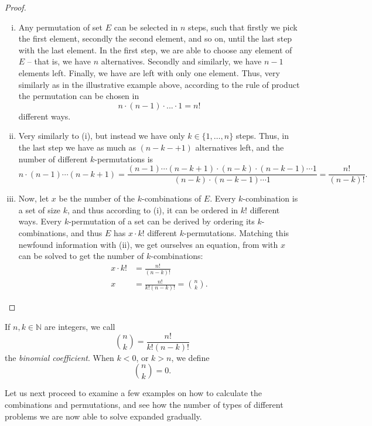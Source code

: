 \documentclass[12pt,a4paper,leqno]{report}
\newcommand{\N}{\mathbb{N}}
\theoremstyle{plain}
\theoremstyle{definition}
\begin{document}
\begin{proof} \leavevmode
\begin{enumerate}[(i)]
\item Any permutation of set $E$ can be selected in $n$ steps, such that firstly we pick the first element, secondly the second element, and so on, until the last step with the last element. In the first step, we are able to choose any element of $E$ -- that is, we have $n$ alternatives. Secondly and similarly, we have $n-1$ elements left. Finally, we have are left with only one element. Thus, very similarly as in the illustrative example above, according to the rule of product the permutation can be chosen in 
\[
n \cdot (n-1) \cdot ... \cdot 1 = n!
\]
different ways.

\item Very similarly to (i), but instead we have only $k \in \{1, \dots , n\}$ steps. Thus, in the last step we have as much as $(n-k-+1)$ alternatives left, and the number of different $k$-permutations is
\[
n \cdot (n-1) \cdots (n-k+1) = \frac{(n-1) \cdots (n-k+1) \cdot (n-k) \cdot (n-k-1) \cdots 1}{(n-k) \cdot (n-k-1) \cdots 1} = \frac{n!}{(n-k)!}.
\]

\item Now, let $x$ be the number of the $k$-combinations of $E$. Every $k$-combination is a set of size $k$, and thus according to (i), it can be ordered in $k!$ different ways. Every $k$-permutation of a set can be derived by ordering its $k$-combinations, and thus $E$ has $x \cdot k!$ different $k$-permutations. Matching this newfound information with (ii), we get ourselves an equation, from with $x$ can be solved to get the number of $k$-combinations:
\[
\begin{split}
x \cdot k! &= \frac{n!}{(n-k)!} \\
		 x &= \frac{n!}{k!(n-k)!} = \binom{n}{k}.
\end{split}
\]

\end{enumerate}
\end{proof}

If $n,k \in \N$ are integers, we call  
\[
\binom{n}{k} = \frac{n!}{k!(n-k)!} 
\] 
the \emph{binomial coefficient}. When $k < 0$, or $k>n$, we define
\[
\binom{n}{k} = 0.
\]

\bigskip

Let us next proceed to examine a few examples on how to calculate the combinations and permutations, and see how the number of types of different problems we are now able to solve expanded gradually.
\end{document}
